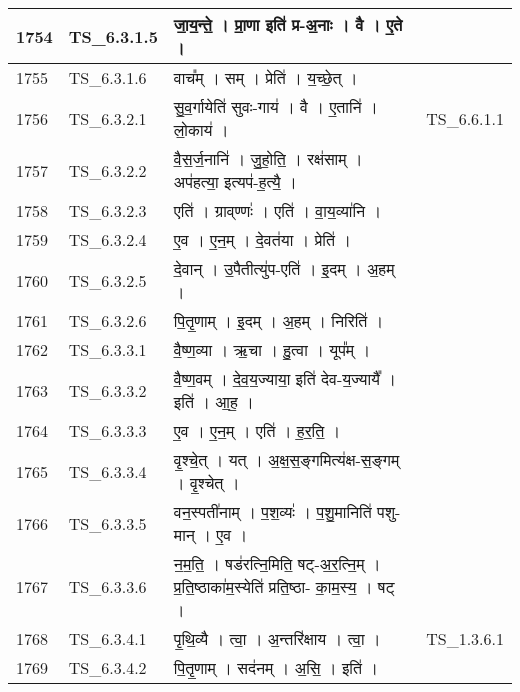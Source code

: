 \documentclass[17pt]{extarticle}
\begin{document}
\begin{longtable}{||p{0.4in}||p{0.9in}||p{4.0in}||p{0.9in}||}
        \hline
            1754 & TS\_6.3.1.5 & जा॒य॒न्ते॒   ।   प्रा॒णा इति॑ प्र{-}अ॒नाः   ।   वै   ।   ए॒ते   ।    &      \\
        \hline
            1755 & TS\_6.3.1.6 & वाच᳚म्   ।   सम्   ।   प्रेति॑   ।   य॒च्छे॒त्   ।    &      \\
        \hline
            1756 & TS\_6.3.2.1 & सु॒व॒र्गायेति॑ सुवः{-}गाय॑   ।   वै   ।   ए॒तानि॑   ।   लो॒काय॑   ।    &  TS\_6.6.1.1       \\
        \hline
            1757 & TS\_6.3.2.2 & वै॒स॒र्ज॒नानि॑   ।   जु॒हो॒ति॒   ।   रक्ष॑साम्   ।   अप॑हत्या॒ इत्यप॑{-}ह॒त्यै॒   ।    &      \\
        \hline
            1758 & TS\_6.3.2.3 & एति॑   ।   ग्राव्‌ण्णः॑   ।   एति॑   ।   वा॒य॒व्या॑नि   ।    &      \\
        \hline
            1759 & TS\_6.3.2.4 & ए॒व   ।   ए॒न॒म्   ।   दे॒वत॑या   ।   प्रेति॑   ।    &      \\
        \hline
            1760 & TS\_6.3.2.5 & दे॒वान्   ।   उ॒पैतीत्यु॑प{-}एति॑   ।   इ॒दम्   ।   अ॒हम्   ।    &      \\
        \hline
            1761 & TS\_6.3.2.6 & पि॒तृ॒णाम्   ।   इ॒दम्   ।   अ॒हम्   ।   निरिति॑   ।    &      \\
        \hline
            1762 & TS\_6.3.3.1 & वै॒ष्ण॒व्या   ।   ऋ॒चा   ।   हु॒त्वा   ।   यूप᳚म्   ।    &      \\
        \hline
            1763 & TS\_6.3.3.2 & वै॒ष्ण॒वम्   ।   दे॒व॒य॒ज्याया॒ इति॑ देव{-}य॒ज्यायै᳚   ।   इति॑   ।   आ॒ह॒   ।    &      \\
        \hline
            1764 & TS\_6.3.3.3 & ए॒व   ।   ए॒न॒म्   ।   एति॑   ।   ह॒र॒ति॒   ।    &      \\
        \hline
            1765 & TS\_6.3.3.4 & वृ॒श्चे॒त्   ।   यत्   ।   अ॒क्ष॒स॒ङ्गमित्य॑क्ष{-}स॒ङ्गम्   ।   वृ॒श्चेत्   ।    &      \\
        \hline
            1766 & TS\_6.3.3.5 & वन॒स्पती॑नाम्   ।   प॒श॒व्यः॑   ।   प॒शु॒मानिति॑ पशु{-}मान्   ।   ए॒व   ।    &      \\
        \hline
            1767 & TS\_6.3.3.6 & न॒म॒ति॒   ।   षड॑रत्नि॒मिति॒ षट्{-}अ॒र॒त्नि॒म्   ।   प्र॒ति॒ष्ठाका॑म॒स्येति॑ प्रति॒ष्ठा{-} का॒म॒स्य॒   ।   षट्   ।    &      \\
        \hline
            1768 & TS\_6.3.4.1 & पृ॒थि॒व्यै   ।   त्वा॒   ।   अ॒न्तरि॑क्षाय   ।   त्वा॒   ।    & TS\_1.3.6.1        \\
        \hline
            1769 & TS\_6.3.4.2 & पि॒तृ॒णाम्   ।   सद॑नम्   ।   अ॒सि॒   ।   इति॑   ।    &      \\

\end{longtable}
\end{document}
